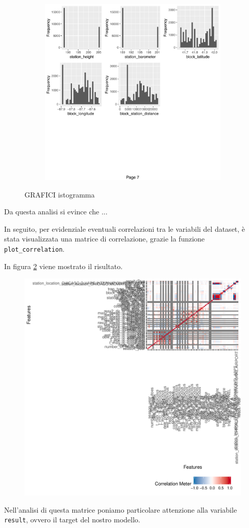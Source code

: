 \begin{figure}
\begin{subfigure}[t]{0.49\textwidth}
	\end{subfigure}
	\begin{subfigure}[t]{0.49\textwidth}
		\includegraphics[width=\textwidth]{images/ml/plot_histogram7}
	\end{subfigure}

	
\caption{GRAFICI istogramma}
\label{fig:plot_histogram}
\end{figure}

Da questa analisi si evince che ...


In seguito, per evidenziale eventuali correlazioni tra le variabili del 
dataset, è stata visualizzata una matrice di correlazione, grazie la funzione 
\texttt{plot\_correlation}.

In figura \ref{fig:plot_correlation} viene mostrato il risultato.

\begin{figure}[htb]
	\centering
	\includegraphics[width=0.5\columnwidth]{images/ml/plot_correlation}
	\caption{}
	\label{fig:plot_correlation}
\end{figure}

Nell'analisi di questa matrice poniamo particolare attenzione alla variabile 
\texttt{result}, ovvero il target del nostro modello.
